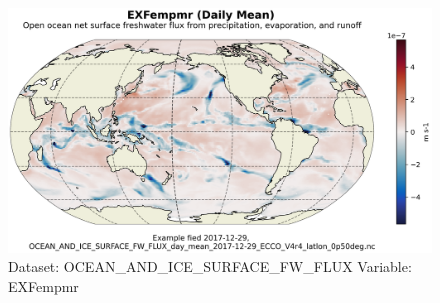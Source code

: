 \begin{figure}[H]
\centering
\includegraphics[scale=0.55]{../images/plots/latlon_plots/Ocean_and_Sea-Ice_Surface_Freshwater_Fluxes/EXFempmr.png}
\caption{Dataset: OCEAN\_AND\_ICE\_SURFACE\_FW\_FLUX Variable: EXFempmr}
\label{tab:table-OCEAN_AND_ICE_SURFACE_FW_FLUX_EXFempmr-Plot}
\end{figure}
\pagebreak
